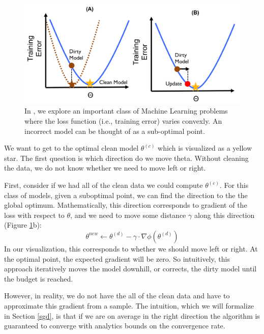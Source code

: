 \begin{figure}[ht!]
\centering
 \includegraphics[width=\columnwidth]{figs/update-arch2.png}
 \caption{In \sys, we explore an important class of Machine Learning problems where the loss function (i.e., training error) varies convexly. An incorrect model can be thought of as a sub-optimal point. \label{update-arch2}}
\end{figure}

We want to get to the optimal clean model $\theta^{(c)}$ which is visualized as a yellow star.
The first question is which direction do we move theta.
Without cleaning the data, we do not know whether we need to move left or right.

First, consider if we had all of the clean data we could compute $\theta^{(c)}$.
For this class of models, given a suboptimal point, we can find the direction to the 
the global optimum.
Mathematically, this direction corresponds to gradient of the loss with respect to $\theta$, and we need to move some distance $\gamma$ along this direction (Figure \ref{update-arch2}b):
\[
\theta^{new} \leftarrow \theta^{(d)} - \gamma \cdot \nabla\phi(\theta^{(d)})
\]
In our visualization, this corresponds to whether we should move left or right.
At the optimal point, the expected gradient will be zero.
So intuitively, this approach iteratively moves the model downhill, or corrects, the dirty model until the budget is reached.

However, in reality, we do not have the all of the clean data and have to approximate this gradient from a sample.
The intuition, which we will formalize in Section \ref{sgd}, is that if we are on average in the right direction the algorithm is guaranteed to converge with analytics bounds on the convergence rate.

